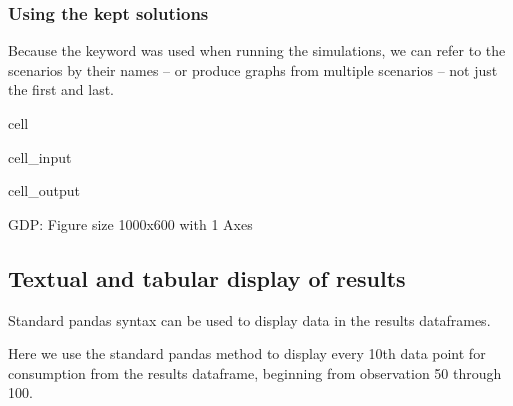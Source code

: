 \documentclass[letterpaper,10pt,english]{jupyterBook}
\begin{document}
\subsubsection{Using the kept solutions}
\label{\detokenize{content/03_Installation/TestingModelFlow:using-the-kept-solutions}}
\sphinxAtStartPar
Because the keyword  was used when running the simulations, we can refer to the scenarios by their names – or produce graphs from multiple scenarios – not just the first and last.

\begin{sphinxuseclass}{cell}\begin{sphinxVerbatimInput}

\begin{sphinxuseclass}{cell_input}
\begin{sphinxVerbatim}[commandchars=\\\{\}]
    
\end{sphinxVerbatim}

\end{sphinxuseclass}\end{sphinxVerbatimInput}
\begin{sphinxVerbatimOutput}

\begin{sphinxuseclass}{cell_output}
\begin{sphinxVerbatim}[commandchars=\\\{\}]
\PYGZob{}\PYGZsq{}GDP\PYGZsq{}: \PYGZlt{}Figure size 1000x600 with 1 Axes\PYGZgt{}\PYGZcb{}
\end{sphinxVerbatim}

\end{sphinxuseclass}\end{sphinxVerbatimOutput}

\end{sphinxuseclass}

\subsection{Textual and tabular display of results}
\label{\detokenize{content/03_Installation/TestingModelFlow:textual-and-tabular-display-of-results}}
\sphinxAtStartPar
Standard pandas syntax can be used to display data in the results dataframes.

\sphinxAtStartPar
Here we use the standard pandas  method to display every 10th data point for consumption from the results dataframe, beginning from observation 50 through 100.
\end{document}
